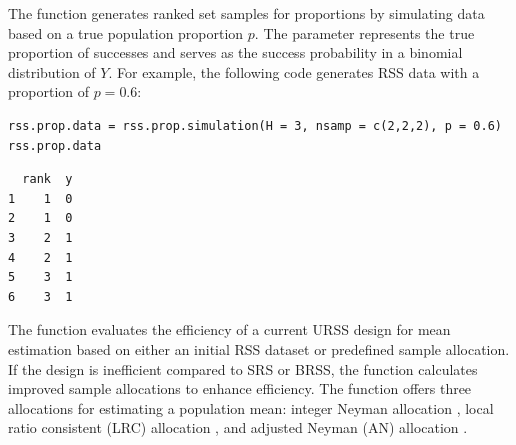 %
The  function generates ranked set samples for proportions by simulating data based on a true population proportion $p$. The  parameter represents the true proportion of successes and serves as the success probability in a binomial distribution of $Y$. For example, the following code generates RSS data with a proportion of $p=0.6$:
%

\begin{verbatim}
rss.prop.data = rss.prop.simulation(H = 3, nsamp = c(2,2,2), p = 0.6)
rss.prop.data
\end{verbatim}
\begin{verbatim}
  rank  y
1    1  0
2    1  0
3    2  1
4    2  1
5    3  1
6    3  1
\end{verbatim}
%
The  function evaluates the efficiency of a current URSS design for mean  estimation based on either an initial RSS dataset or predefined sample allocation. If the design is inefficient compared to SRS or BRSS, the function calculates improved sample allocations to enhance efficiency. The function offers three allocations for estimating a population mean: integer Neyman allocation \citep{wright2012equivalence}, local ratio consistent (LRC) allocation \citep{Ahn:2022}, and adjusted Neyman (AN) allocation \citep{Ahn:2022}. 

